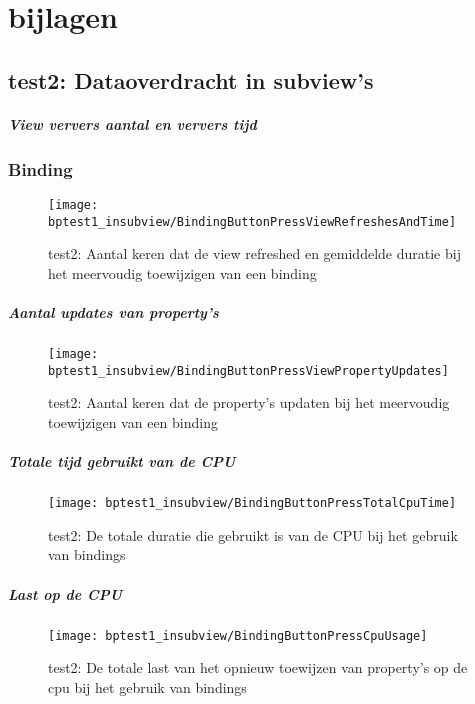 \chapter{bijlagen}

\section{test2: Dataoverdracht in subview's}
\paragraph{View ververs aantal en ververs tijd }
\subsection{Binding}
\begin{figure}[H]
    \centering
    \texttt{[image: bptest1\_insubview/BindingButtonPressViewRefreshesAndTime]} 
    \caption{test2: Aantal keren dat de view refreshed en gemiddelde duratie bij het meervoudig toewijzigen van een binding}
    \label{fig:viewRefreshesBinding1}
\end{figure}
\paragraph{Aantal updates van property's}
\begin{figure}[H]
    \centering
    \texttt{[image: bptest1\_insubview/BindingButtonPressViewPropertyUpdates]} 
    \caption{test2: Aantal keren dat de property's updaten bij het meervoudig toewijzigen van een binding}
    \label{fig:propertyUpdatesBinding1}
\end{figure}
\paragraph{Totale tijd gebruikt van de CPU}
\begin{figure}[H]
    \centering
    \texttt{[image: bptest1\_insubview/BindingButtonPressTotalCpuTime]} 
    \caption{test2: De totale duratie die gebruikt is van de CPU bij het gebruik van bindings}
    \label{fig:cpuUsageTimeBinding1}
\end{figure}
\paragraph{Last op de CPU}
\begin{figure}[H]
    \centering
    \texttt{[image: bptest1\_insubview/BindingButtonPressCpuUsage]} 
    \caption{test2: De totale last van het opnieuw toewijzen van property's op de cpu bij het gebruik van bindings}
    \label{fig:cpuWeightBinding1}
\end{figure}

